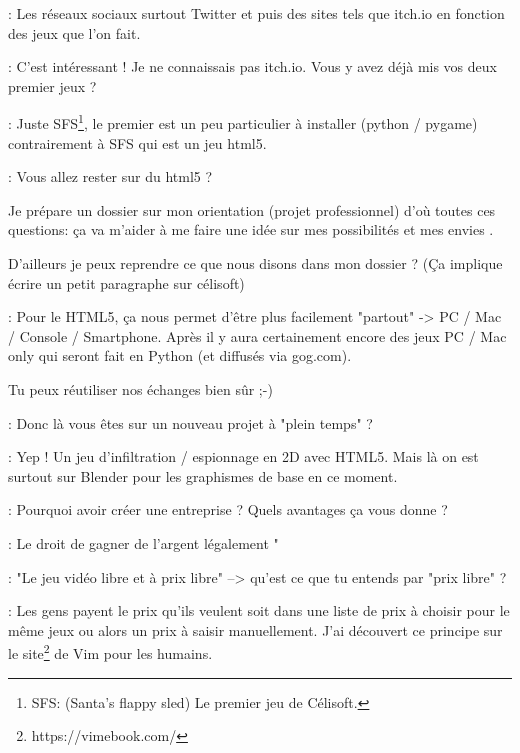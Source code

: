 \documentclass[a4paper,12pt, draft]{report}
\begin{document}
\begin{description}
\item 
\item [Réponse]: Les réseaux sociaux surtout Twitter et puis des sites tels que itch.io en fonction des jeux que l'on fait.
\item 
\item [Question]: C'est intéressant ! Je ne connaissais pas itch.io. Vous y avez déjà mis vos deux premier jeux ?
\item 
\item [Réponse]: Juste SFS\footnote{\textsc{SFS}: (Santa's flappy sled) Le premier jeu de Célisoft.}, le premier est un peu particulier à installer (python / pygame) contrairement à SFS qui est un jeu html5.
\item 
\item [Question]: Vous allez rester sur du html5 ?
\item Je prépare un dossier sur mon orientation (projet professionnel) d'où toutes ces questions: ça va m'aider à me faire une idée sur mes possibilités et mes envies  .
\item D'ailleurs je peux reprendre ce que nous disons dans mon dossier ? (Ça implique écrire un petit paragraphe sur célisoft)
\item 
\item [Réponse]: Pour le HTML5, ça nous permet d'être plus facilement "partout" -> PC / Mac / Console / Smartphone. Après il y aura certainement encore des jeux PC / Mac only qui seront fait en Python (et diffusés via gog.com).
\item Tu peux réutiliser nos échanges bien sûr ;-)
\item 
\item [Question]: Donc là vous êtes sur un nouveau projet à "plein temps" ?
\item 
\item [Réponse]: Yep ! Un jeu d'infiltration / espionnage en 2D avec HTML5. Mais là on est surtout sur Blender pour les graphismes de base en ce moment.
\item 
\item [Question]: Pourquoi avoir créer une entreprise ? Quels avantages ça vous donne ?
\item 
\item [Réponse]: Le droit de gagner de l'argent légalement  "
\item 
\item [Question]: "Le jeu vidéo libre et à prix libre" --> qu'est ce que tu entends par "prix libre" ?  
\item 
\item [Réponse]: Les gens payent le prix qu'ils veulent soit dans une liste de prix à choisir pour le même jeux ou alors un prix à saisir manuellement. J'ai découvert ce principe sur le site\footnote{https://vimebook.com/} de Vim pour les humains.

\end{description}
\end{document}
